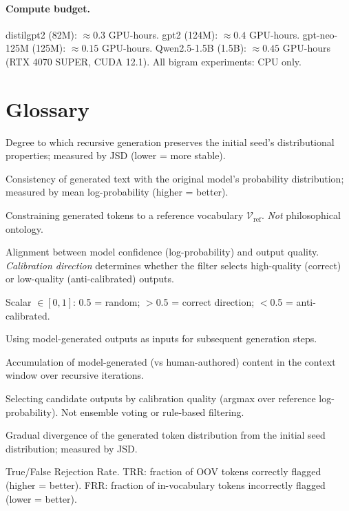 \documentclass[11pt]{article}
\begin{document}
\paragraph{Compute budget.} distilgpt2 (82M): $\approx 0.3$ GPU-hours. gpt2 (124M): $\approx 0.4$ GPU-hours. gpt-neo-125M (125M): $\approx 0.15$ GPU-hours. Qwen2.5-1.5B (1.5B): $\approx 0.45$ GPU-hours (RTX 4070 SUPER, CUDA 12.1). All bigram experiments: CPU only.

\section{Glossary}
\label{app:glossary}

\begin{description}[style=nextline,leftmargin=3cm]
  \item[Stability] Degree to which recursive generation preserves the initial seed's distributional properties; measured by JSD (lower = more stable).
  \item[Fidelity] Consistency of generated text with the original model's probability distribution; measured by mean log-probability (higher = better).
  \item[Anchoring] Constraining generated tokens to a reference vocabulary $\mathcal{V}_{\mathrm{ref}}$. \emph{Not} philosophical ontology.
  \item[Calibration] Alignment between model confidence (log-probability) and output quality. \emph{Calibration direction} determines whether the filter selects high-quality (correct) or low-quality (anti-calibrated) outputs.
  \item[Calibration Quality (CQ)] Scalar $\in [0,1]$: 0.5 = random; $>$0.5 = correct direction; $<$0.5 = anti-calibrated.
  \item[Recursive Exposure] Using model-generated outputs as inputs for subsequent generation steps.
  \item[Synthetic Contamination] Accumulation of model-generated (vs human-authored) content in the context window over recursive iterations.
  \item[Epistemic Filtering] Selecting candidate outputs by calibration quality (argmax over reference log-probability). Not ensemble voting or rule-based filtering.
  \item[Recursive Drift] Gradual divergence of the generated token distribution from the initial seed distribution; measured by JSD.
  \item[TRR / FRR] True/False Rejection Rate. TRR: fraction of OOV tokens correctly flagged (higher = better). FRR: fraction of in-vocabulary tokens incorrectly flagged (lower = better).
\end{description}



\end{document}
